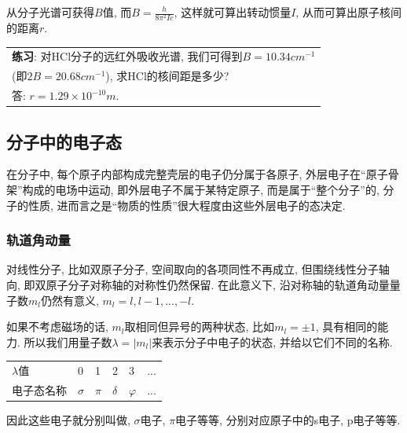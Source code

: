 从分子光谱可获得$B$值, 而$B = \frac{h}{8\pi^2 Ic}$,
这样就可算出转动惯量$I$, 从而可算出原子核间的距离$r$.


\begin{center}

\begin{tabular}{|l|}
  \hline

\textbf{练习}: 对HCl分子的远红外吸收光谱, 我们可得到$B=10.34
cm^{-1}$\\(即$2B = 20.68 cm^{-1}$), 求HCl的核间距是多少?
\\答: $r=1.29
\times 10^{-10} m$.\\

  \hline
\end{tabular}

\end{center}


\subsection{分子中的电子态}

在分子中, 每个原子内部构成完整壳层的电子仍分属于各原子,
外层电子在“原子骨架”构成的电场中运动, 即外层电子不属于某特定原子,
而是属于“整个分子”的, 分子的性质,
进而言之是``物质的性质''很大程度由这些外层电子的态决定.


\subsubsection*{轨道角动量}

对线性分子, 比如双原子分子, 空间取向的各项同性不再成立,
但围绕线性分子轴向, 即双原子分子对称轴的对称性仍然保留. 在此意义下,
沿对称轴的轨道角动量量子数$m_l$仍然有意义, $m_l = l, l-1,..., -l$.

如果不考虑磁场的话, $m_l$取相同但异号的两种状态, 比如$m_l = \pm 1$,
具有相同的能力. 所以我们用量子数$\lambda =
|m_l|$来表示分子中电子的状态, 并给以它们不同的名称.


\begin{center}
\begin{tabular}{|l|l|l|l|l|l|}
  \hline
  $\lambda$值 & 0 & 1 & 2 & 3 & ... \\
  电子态名称 & $\sigma$ & $\pi$ & $\delta$ & $\varphi$ & ... \\
  \hline
\end{tabular}
\end{center}

因此这些电子就分别叫做, $\sigma$电子, $\pi$电子等等,
分别对应原子中的s电子, p电子等等.

